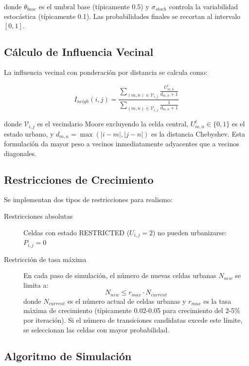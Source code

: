 donde $\theta_{base}$ es el umbral base (típicamente 0.5) y $\sigma_{stoch}$ controla la variabilidad estocástica (típicamente 0.1). Las probabilidades finales se recortan al intervalo $[0, 1]$.

\subsection{Cálculo de Influencia Vecinal}

La influencia vecinal con ponderación por distancia se calcula como:

\begin{equation}
I_{neigh}(i,j) = \frac{\sum_{(m,n) \in \mathcal{V}_{i,j}} \frac{U_{m,n}^t}{d_{m,n} + 1}}{\sum_{(m,n) \in \mathcal{V}_{i,j}} \frac{1}{d_{m,n} + 1}}
\label{eq:neighborhood_influence}
\end{equation}

donde $\mathcal{V}_{i,j}$ es el vecindario Moore excluyendo la celda central, $U_{m,n}^t \in \{0,1\}$ es el estado urbano, y $d_{m,n} = \max(|i-m|, |j-n|)$ es la distancia Chebyshev. Esta formulación da mayor peso a vecinos inmediatamente adyacentes que a vecinos diagonales.

\subsection{Restricciones de Crecimiento}

Se implementan dos tipos de restricciones para realismo:

\begin{description}
\item[Restricciones absolutas] Celdas con estado RESTRICTED ($U_{i,j} = 2$) no pueden urbanizarse: $P_{i,j} = 0$
\item[Restricción de tasa máxima] En cada paso de simulación, el número de nuevas celdas urbanas $N_{new}$ se limita a:
\begin{equation}
N_{new} \leq r_{max} \cdot N_{current}
\end{equation}
donde $N_{current}$ es el número actual de celdas urbanas y $r_{max}$ es la tasa máxima de crecimiento (típicamente 0.02-0.05 para crecimiento del 2-5\% por iteración). Si el número de transiciones candidatas excede este límite, se seleccionan las celdas con mayor probabilidad.
\end{description}

\subsection{Algoritmo de Simulación}

